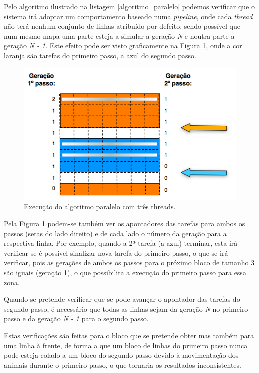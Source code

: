 \documentclass[12pt]{article}
\begin{document}
Pelo algoritmo ilustrado na listagem \ref{algoritmo_paralelo} podemos verificar que o sistema
irá adoptar um comportamento baseado numa \textit{pipeline}, onde cada \textit{thread} não terá
nenhum conjunto de linhas atribuído por defeito, sendo possível que num mesmo mapa uma parte esteja
a simular a geração \textit{N} e noutra parte a geração \textit{N - 1}.
Este efeito pode ser visto graficamente na Figura \ref{fig:evolucao}, onde a cor laranja
são tarefas do primeiro passo, a azul do segundo passo.

\begin{figure}[ht]
  \centering
    \includegraphics[scale=0.8]{diagrama_evolucao.png}
  \caption{Execução do algoritmo paralelo com três threads.}
  \label{fig:evolucao}
\end{figure}

Pela Figura \ref{fig:evolucao} podem-se também ver os apontadores das tarefas para ambos os passos (setas do lado direito)
e de cada lado o número da geração para a respectiva linha. Por exemplo, quando a 2ª tarefa (a azul) terminar,
esta irá verificar se é possível sinalizar nova tarefa do primeiro passo, o que se irá verificar,
pois as gerações de ambos os passos para o próximo bloco de tamanho 3 são iguais (geração 1), o que possibilita
a execução do primeiro passo para essa zona. 

Quando se pretende verificar que se pode avançar o apontador das tarefas do segundo passo, é necessário
que todas as linhas sejam da geração \textit{N} no primeiro passo e da geração \textit{N - 1} para o segundo
passo.

Estas verificações são feitas para o bloco que se pretende obter mas também para uma linha à frente, de forma
a que um bloco de linhas do primeiro passo nunca pode esteja colado a um bloco do segundo passo devido à
movimentação dos animais durante o primeiro passo, o que tornaria os resultados inconsistentes.
\end{document}
